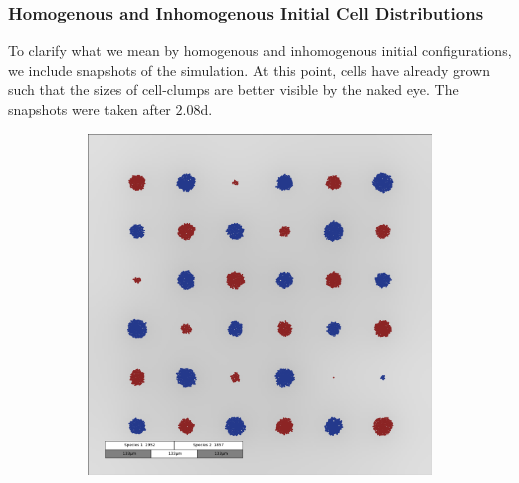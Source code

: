 \documentclass[10pt,A4paper]{article}
\numberwithin{equation}{section}
\begin{document}
\subsubsection{Homogenous and Inhomogenous Initial Cell Distributions}
To clarify what we mean by homogenous and inhomogenous initial configurations, we include snapshots of the simulation.
At this point, cells have already grown such that the sizes of cell-clumps are better visible by the naked eye.
The snapshots were taken after $2.08$\unit{\day}.
\begin{figure}
    \centering
    \begin{subfigure}[c]{0.5\textwidth}
        \includegraphics[width=\textwidth]{Figures/abm-homogenous/images/snapshot_00012000.png}
    \end{subfigure}%
    \begin{subfigure}[c]{0.5\textwidth}

\end{subfigure}
\end{figure}
\end{document}
